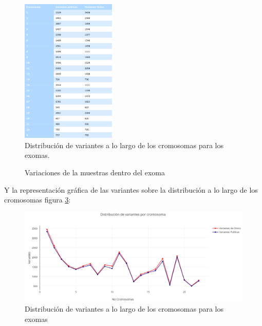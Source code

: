 \begin{figure}[H]
	\centering
	\includegraphics[width=0.4\textwidth]{Kap2/latex_table2}
	\caption{Distribución de variantes a lo largo de los cromosomas para los exomas.} \label{fig:tabla2}
\end{figure}

\begin{figure}[H]
	\centering
	\caption{Variaciones de la muestras dentro del exoma}
	\label{f:histogramas2}
\end{figure}

Y la representación gráfica de las variantes sobre la distribución a lo largo de los cromosomas figura \ref{fig:variaciones2}:

\begin{figure}[H]
	\centering
	\includegraphics[width=1\textwidth]{Kap2/variaciones2}
	\caption{Distribución de variantes a lo largo de los cromosomas para los exomas} \label{fig:variaciones2}
\end{figure}

